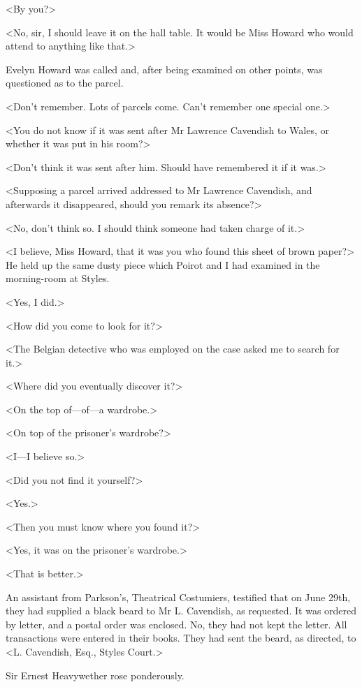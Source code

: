  <By you?> 

 <No, sir, I should leave it on the hall table. It would be Miss Howard who would attend to anything like that.> 

 Evelyn Howard was called and, after being examined on other points, was questioned as to the parcel. 

 <Don't remember. Lots of parcels come. Can't remember one special one.> 

 <You do not know if it was sent after Mr Lawrence Cavendish to Wales, or whether it was put in his room?> 

 <Don't think it was sent after him. Should have remembered it if it was.> 

 <Supposing a parcel arrived addressed to Mr Lawrence Cavendish, and afterwards it disappeared, should you remark its absence?> 

 <No, don't think so. I should think someone had taken charge of it.> 

 <I believe, Miss Howard, that it was you who found this sheet of brown paper?> He held up the same dusty piece which Poirot and I had examined in the morning-room at Styles. 

 <Yes, I did.> 

 <How did you come to look for it?> 

 <The Belgian detective who was employed on the case asked me to search for it.> 

 <Where did you eventually discover it?> 

 <On the top of—of—a wardrobe.> 

 <On top of the prisoner's wardrobe?> 

 <I—I believe so.> 

 <Did you not find it yourself?> 

 <Yes.> 

 <Then you must know where you found it?> 

 <Yes, it was on the prisoner's wardrobe.> 

 <That is better.> 

 An assistant from Parkson's, Theatrical Costumiers, testified that on June 29th, they had supplied a black beard to Mr L. Cavendish, as requested. It was ordered by letter, and a postal order was enclosed. No, they had not kept the letter. All transactions were entered in their books. They had sent the beard, as directed, to <L. Cavendish, Esq., Styles Court.> 

 Sir Ernest Heavywether rose ponderously. 


